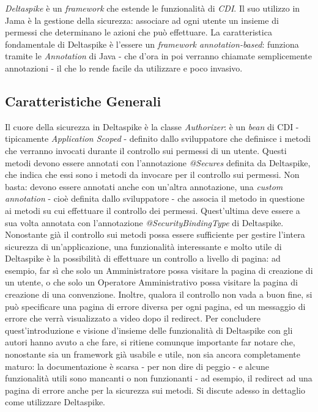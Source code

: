 \textsl{Deltaspike} è un \textit{framework} che estende le funzionalità di \textsl{CDI}. Il suo utilizzo in Jama è la gestione della sicurezza: associare ad ogni utente un insieme di permessi che determinano le azioni che può effettuare.
La caratteristica fondamentale di Deltaspike è l'essere un \textit{framework annotation-based}: funziona tramite le \textsl{Annotation} di Java - che d'ora in poi verranno chiamate semplicemente annotazioni - il che lo rende facile da utilizzare e poco invasivo.

\subsection{Caratteristiche Generali}
Il cuore della sicurezza in Deltaspike è la classe \textsl{Authorizer}: è un \textit{bean} di CDI - tipicamente \textsl{Application Scoped} - definito dallo sviluppatore che definisce i metodi che verranno invocati durante il controllo sui permessi di un utente. Questi metodi devono essere annotati con l'annotazione \textsl{@Secures} definita da Deltaspike, che indica che essi sono i metodi da invocare per il controllo sui permessi. Non basta: devono essere annotati anche con un'altra annotazione, una \textsl{custom annotation} - cioè definita dallo sviluppatore - che associa il metodo in questione ai metodi su cui effettuare il controllo dei permessi. Quest'ultima deve essere a sua volta annotata con l'annotazione \textsl{@SecurityBindingType} di Deltaspike.\newline
Nonostante già il controllo sui metodi possa essere sufficiente per gestire l'intera sicurezza di un'applicazione, una funzionalità interessante e molto utile di Deltaspike è la possibilità di effettuare un controllo a livello di pagina: ad esempio, far sì che solo un Amministratore possa visitare la pagina di creazione di un utente, o che solo un Operatore Amministrativo possa visitare la pagina di creazione di una convenzione. Inoltre, qualora il controllo non vada a buon fine, si può specificare una pagina di errore diversa per ogni pagina, ed un messaggio di errore che verrà visualizzato a video dopo il redirect.\newline
Per concludere quest'introduzione e visione d'insieme delle funzionalità di Deltaspike con gli autori hanno avuto a che fare, si ritiene comunque importante far notare che, nonostante sia un framework già usabile e utile, non sia ancora completamente maturo: la documentazione è scarsa - per non dire di peggio - e alcune funzionalità utili sono mancanti o non funzionanti - ad esempio, il redirect ad una pagina di errore anche per la sicurezza sui metodi.\newline
Si discute adesso in dettaglio come utilizzare Deltaspike.




